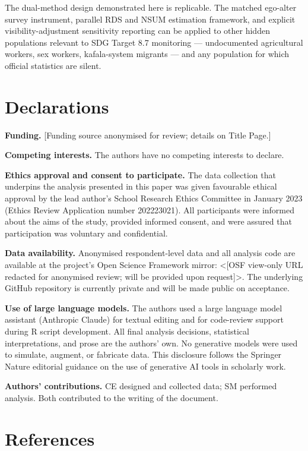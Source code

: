 \documentclass[
  12pt,
  letterpaper,
  DIV=11,
  numbers=noendperiod]{scrartcl}
\begin{document}
The dual-method design demonstrated here is replicable. The matched
ego-alter survey instrument, parallel RDS and NSUM estimation framework,
and explicit visibility-adjustment sensitivity reporting can be applied
to other hidden populations relevant to SDG Target 8.7 monitoring ---
undocumented agricultural workers, sex workers, kafala-system migrants
--- and any population for which official statistics are silent.

\section{Declarations}\label{sec-declarations}

\textbf{Funding.} {[}Funding source anonymised for review; details on
Title Page.{]}

\textbf{Competing interests.} The authors have no competing interests to
declare.

\textbf{Ethics approval and consent to participate.} The data collection
that underpins the analysis presented in this paper was given favourable
ethical approval by the lead author's School Research Ethics Committee
in January 2023 (Ethics Review Application number 202223021). All
participants were informed about the aims of the study, provided
informed consent, and were assured that participation was voluntary and
confidential.

\textbf{Data availability.} Anonymised respondent-level data and all
analysis code are available at the project's Open Science Framework
mirror: \textless{[}OSF view-only URL redacted for anonymised review;
will be provided upon request{]}\textgreater. The underlying GitHub
repository is currently private and will be made public on acceptance.

\textbf{Use of large language models.} The authors used a large language
model assistant (Anthropic Claude) for textual editing and for
code-review support during R script development. All final analysis
decisions, statistical interpretations, and prose are the authors' own.
No generative models were used to simulate, augment, or fabricate data.
This disclosure follows the Springer Nature editorial guidance on the
use of generative AI tools in scholarly work.

\textbf{Authors' contributions.} CE designed and collected data; SM
performed analysis. Both contributed to the writing of the document.

\newpage

\section*{References}\label{references}

\printbibliography[heading=none]
\end{document}
